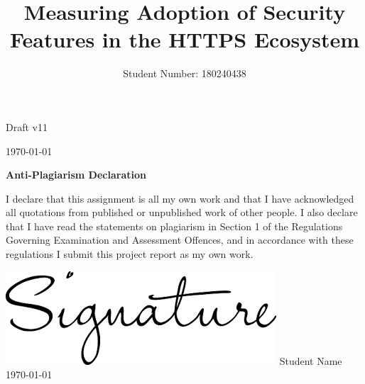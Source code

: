 \documentclass{mscreport}
\begin{document}

\vspace*{\fill}
\begin{center}
\begin{huge}
Draft v11

\vspace{3cm}
\today
\end{huge}
\end{center}
\vspace{\fill}

\newpage


\author{Student Number: 180240438	}
\title{Measuring Adoption of Security Features in the HTTPS Ecosystem}

\maketitle 


\begin{center}
    {\Large\bfseries Anti-Plagiarism Declaration}
    \vspace{1cm}
\begin{enumerate}

I declare that this assignment is all my own work and that I have acknowledged all quotations from published or unpublished work of other people.  I also declare that I have read the statements on plagiarism in Section 1 of the Regulations Governing Examination and Assessment Offences, and in accordance with these regulations I submit this project report as my own work.

\begin{flushleft}
\includegraphics[scale=0.21]{../images/signature.png} %
\newline
  \begingroup
    \noindent\textsf{Student Name} \vspace{0.5cm}\\
    \noindent\textsf{\today}
  \endgroup
  \end{flushleft}

\end{enumerate}
\end{center}
\end{document}
